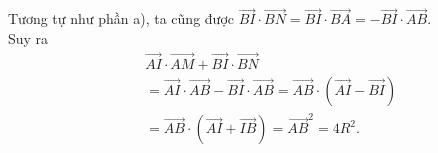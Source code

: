\begin{bt}
{\begin{listEX}
	\item Tương tự như phần a), ta cũng được $\overrightarrow{B I} \cdot \overrightarrow{B N}=\overrightarrow{B I} \cdot \overrightarrow{B A}=-\overrightarrow{B I} \cdot \overrightarrow{A B}$.\\
	Suy ra
	{\allowdisplaybreaks
		\begin{eqnarray*}
		&&\overrightarrow{A I} \cdot \overrightarrow{A M}+\overrightarrow{B I} \cdot \overrightarrow{B N}\\ &&=\overrightarrow{A I} \cdot \overrightarrow{A B}-\overrightarrow{B I} \cdot \overrightarrow{A B}=\overrightarrow{A B} \cdot(\overrightarrow{A I}-\overrightarrow{B I}) \\
		&&=\overrightarrow{A B} \cdot(\overrightarrow{A I}+\overrightarrow{IB})=\overrightarrow{A B}^2=4 R^2.	
	\end{eqnarray*}}
	\end{listEX}
}
\end{bt}

